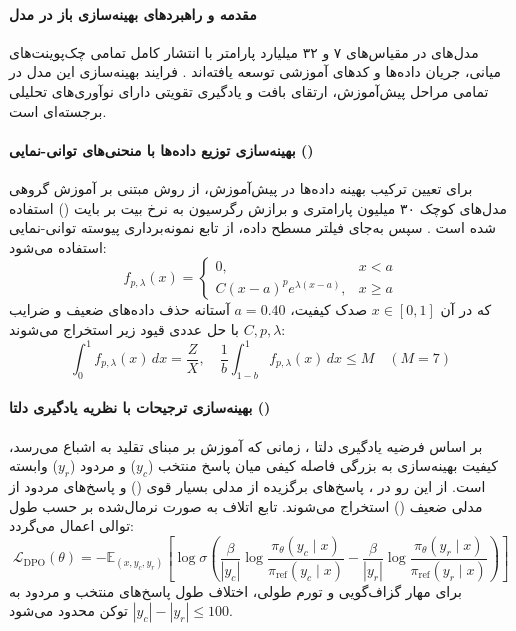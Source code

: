 \item {}

\paragraph*{مقدمه و راهبردهای بهینه‌سازی باز در مدل }
مدل‌های  در مقیاس‌های ۷ و ۳۲ میلیارد پارامتر با انتشار کامل تمامی چک‌پوینت‌های میانی، جریان داده‌ها و کدهای آموزشی توسعه یافته‌اند \cite{olmo2025olmo3}. فرایند بهینه‌سازی این مدل در تمامی مراحل پیش‌آموزش، ارتقای بافت و یادگیری تقویتی دارای نوآوری‌های تحلیلی برجسته‌ای است.

\paragraph*{بهینه‌سازی توزیع داده‌ها با منحنی‌های توانی-نمایی ()}
برای تعیین ترکیب بهینه داده‌ها در پیش‌آموزش، از روش  مبتنی بر آموزش گروهی مدل‌های کوچک ۳۰ میلیون پارامتری و برازش رگرسیون به نرخ بیت بر بایت () استفاده شده است \cite{chen2025olmix}. سپس به‌جای فیلتر مسطح داده، از تابع نمونه‌برداری پیوسته توانی-نمایی استفاده می‌شود:
\begin{equation}
    f_{p, \lambda}(x) = \begin{cases} 
        0, & x < a \\ 
        C(x - a)^p e^{\lambda(x - a)}, & x \ge a 
    \end{cases}
\end{equation}
که در آن $x \in [0, 1]$ صدک کیفیت، $a = 0.40$ آستانه حذف داده‌های ضعیف و ضرایب $C, p, \lambda$ با حل عددی قیود زیر استخراج می‌شوند:
\begin{equation}
    \int_0^1 f_{p, \lambda}(x) \, dx = \frac{Z}{X}, \quad \frac{1}{b} \int_{1-b}^1 f_{p, \lambda}(x) \, dx \le M \quad (M = 7)
\end{equation}

\paragraph*{بهینه‌سازی ترجیحات با نظریه یادگیری دلتا ()}
بر اساس فرضیه یادگیری دلتا \cite{geng2025delta}، زمانی که آموزش بر مبنای تقلید به اشباع می‌رسد، کیفیت بهینه‌سازی به بزرگی فاصله کیفی میان پاسخ منتخب ($y_c$) و مردود ($y_r$) وابسته است. از این رو در ، پاسخ‌های برگزیده از مدلی بسیار قوی () و پاسخ‌های مردود از مدلی ضعیف () استخراج می‌شوند. تابع اتلاف  به صورت نرمال‌شده بر حسب طول توالی اعمال می‌گردد:
\begin{equation}
    \mathcal{L}_{\text{DPO}}(\theta) = -\mathbb{E}_{(x, y_c, y_r)} \left[ \log \sigma \left( \frac{\beta}{|y_c|} \log \frac{\pi_\theta(y_c \mid x)}{\pi_{\text{ref}}(y_c \mid x)} - \frac{\beta}{|y_r|} \log \frac{\pi_\theta(y_r \mid x)}{\pi_{\text{ref}}(y_r \mid x)} \right) \right]
\end{equation}
برای مهار گزاف‌گویی و تورم طولی، اختلاف طول پاسخ‌های منتخب و مردود به $|y_c| - |y_r| \le 100$ توکن محدود می‌شود.


